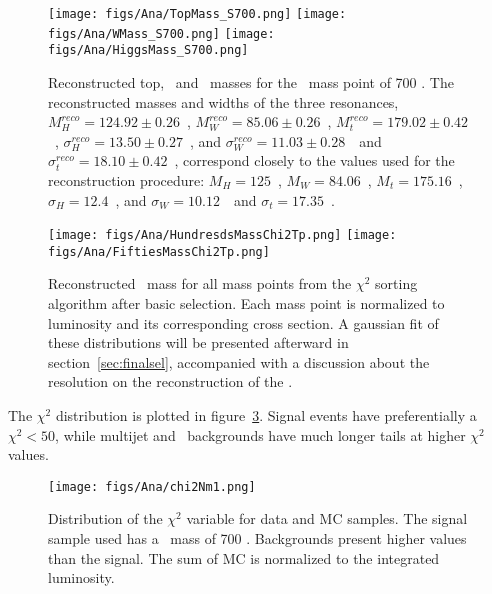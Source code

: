 \begin{figure}[!Hhtbp]
  \begin{center}
    \texttt{[image: figs/Ana/TopMass\_S700.png]}
    \texttt{[image: figs/Ana/WMass\_S700.png]}
    \texttt{[image: figs/Ana/HiggsMass\_S700.png]}
    \caption{Reconstructed top, \W~and \Hb~masses for the \Tp~mass point of 700 \GeVcc. The reconstructed masses and widths of the three resonances, $M^{reco}_{H}=124.92\pm0.26$~\GeVcc, $M^{reco}_{W}=85.06\pm0.26$~\GeVcc, $M^{reco}_{t}=179.02\pm0.42$~\GeVcc, $\sigma^{reco}_{H}=13.50\pm0.27$~\GeVcc, and $\sigma^{reco}_{W}=11.03\pm0.28$~\GeVcc~and $\sigma^{reco}_{t}=18.10\pm0.42$~\GeVcc, correspond closely to the values used for the reconstruction procedure: $M_{H}=125$~\GeVcc, $M_{W}=84.06$~\GeVcc, $M_{t}=175.16$~\GeVcc, $\sigma_{H}=12.4$~\GeVcc, and $\sigma_{W}=10.12$~\GeVcc~and $\sigma_{t}=17.35$~\GeVcc.}
    \label{fig:WHt}
  \end{center}
\end{figure}

\begin{figure}[!Hhtbp]
  \begin{center}
    \texttt{[image: figs/Ana/HundresdsMassChi2Tp.png]}
    \texttt{[image: figs/Ana/FiftiesMassChi2Tp.png]}
    \caption{Reconstructed \Tp~mass for all mass points from the $\chi^{2}$ sorting algorithm after basic selection. Each mass point is normalized to luminosity and its corresponding cross section. A gaussian fit of these distributions will be presented afterward in section~\ref{sec:finalsel}, accompanied with a discussion about the resolution on the reconstruction of the \Tp.}
    \label{fig:RecT}
  \end{center}
\end{figure}

The $\chi^{2}$ distribution is plotted in figure~\ref{fig:chi2}. Signal events have preferentially a $\chi^{2}<50$, while multijet and \ttbar~backgrounds have much longer tails at higher $\chi^{2}$ values.

\begin{figure}[!Hhtbp]
  \begin{center}
    \texttt{[image: figs/Ana/chi2Nm1.png]}
    \caption{Distribution of the $\chi^{2}$ variable for data and MC samples. The signal sample used has a \Tp~mass of 700 \GeVcc. Backgrounds present higher values than the signal. The sum of MC is normalized to the integrated luminosity. }
    \label{fig:chi2}
  \end{center}
\end{figure}

